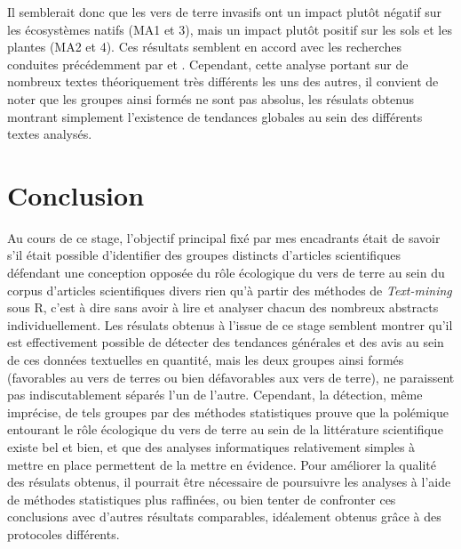 \documentclass{book}
\begin{document}
Il semblerait donc que les vers de terre invasifs ont un impact plutôt négatif sur les écosystèmes natifs (MA1 et 3), mais un impact plutôt positif sur les sols et les plantes (MA2 et 4). Ces résultats semblent en accord avec les recherches conduites précédemment par \cite{12_EW_disrupt_ecosys} et \cite{13_EW_enhance_plant_growth}. Cependant, cette analyse portant sur de nombreux textes théoriquement très différents les uns des autres, il convient de noter que les groupes ainsi formés ne sont pas absolus, les résulats obtenus montrant simplement l'existence de tendances globales au sein des différents textes analysés. 

\thispagestyle{fancy}

\chapter{\label{Cinquième Chapitre}Conclusion}
\noindent
Au cours de ce stage, l'objectif principal fixé par mes encadrants était de savoir s'il était possible d'identifier des groupes distincts d'articles scientifiques défendant une conception opposée du rôle écologique du vers de terre au sein du corpus d'articles scientifiques divers rien qu'à partir des méthodes de \textit{Text-mining} sous R, c'est à dire sans avoir à lire et analyser chacun des nombreux abstracts individuellement. Les résulats obtenus à l'issue de ce stage semblent montrer qu'il est effectivement possible de détecter des tendances générales et des avis au sein de ces données textuelles en quantité, mais les deux groupes ainsi formés (favorables au vers de terres ou bien défavorables aux vers de terre), ne paraissent pas indiscutablement séparés l'un de l'autre. Cependant, la détection, même imprécise, de tels groupes par des méthodes statistiques prouve que la polémique entourant le rôle écologique du vers de terre au sein de la littérature scientifique existe bel et bien, et que des analyses informatiques relativement simples à mettre en place permettent de la mettre en évidence. Pour améliorer la qualité des résulats obtenus, il pourrait être nécessaire de poursuivre les analyses à l'aide de méthodes statistiques plus raffinées, ou bien tenter de confronter ces conclusions avec d'autres résultats comparables, idéalement obtenus grâce à des protocoles différents. 

\thispagestyle{fancy}

\newpage
%


\thispagestyle{fancy}
\end{document}
